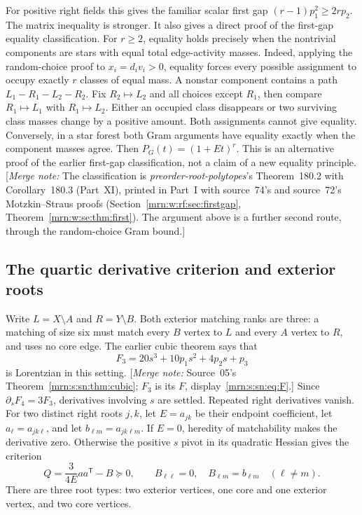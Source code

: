 \documentclass[11pt,a4paper]{article}
\theoremstyle{remark}\newtheorem{remark}[theorem]{Remark}
\newcommand{\PSD}{\succeq}                 %
\newcommand{\mnote}[1]{[\textit{Merge note:} #1]}
\newcommand{\prp}{\emph{preorder-root-polytopes}}
\begin{document}
For positive right fields this gives the familiar scalar first gap
$(r-1)p_1^2\ge2rp_2$. The matrix inequality is stronger.
It also gives a direct proof of the first-gap equality classification.
For $r\ge2$, equality holds precisely when the nontrivial components are
stars with equal total edge-activity masses.
Indeed, applying the random-choice proof to $x_i=d_i v_i>0$, equality
forces every possible assignment to occupy exactly $r$ classes of equal
mass. A nonstar component contains a path
$L_1-R_1-L_2-R_2$. Fix $R_2\mapsto L_2$ and all choices except $R_1$,
then compare $R_1\mapsto L_1$ with $R_1\mapsto L_2$.
Either an occupied class disappears or two surviving class masses change
by a positive amount. Both assignments cannot give equality.
Conversely, in a star forest both Gram arguments have equality exactly
when the component masses agree. Then $P_G(t)=(1+Et)^r$.
This is an alternative proof of the earlier first-gap classification,
not a claim of a new equality principle.
\mnote{The classification is \prp's Theorem~180.2 with Corollary~180.3
(Part~XI), printed in Part~I with source~74's and source~72's
Motzkin--Straus proofs (Section~\ref{mrn:w:rf:sec:firstgap},
Theorem~\ref{mrn:w:se:thm:first}). The argument above is a further second
route, through the random-choice Gram bound.}

\subsection{The quartic derivative criterion and exterior roots}
Write $L=X\setminus A$ and $R=Y\setminus B$. Both exterior matching ranks
are three: a matching of size six must match every $B$ vertex to $L$ and
every $A$ vertex to $R$, and uses no core edge.
The earlier cubic theorem \cite{b:m05} says that
\[
 F_3=20s^3+10p_1s^2+4p_2s+p_3
\]
is Lorentzian in this setting. \mnote{Source~05's
Theorem~\ref{mrn:s:sn:thm:cubic}; $F_3$ is its $F$,
display~\eqref{mrn:s:sn:eq:F}.} Since $\partial_sF_4=3F_3$, derivatives
involving $s$ are settled. Repeated right derivatives vanish. For two
distinct right roots $j,k$, let $E=a_{jk}$ be their endpoint coefficient,
let $a_\ell=a_{jk\ell}$, and let $b_{\ell m}=a_{jk\ell m}$.
If $E=0$, heredity of matchability makes the derivative zero. Otherwise
the positive $s$ pivot in its quadratic Hessian gives the criterion
\begin{equation}\label{mrn:t:tn:eq:paircriterion}
 Q=\frac{3}{4E}aa^{\mathsf T}-B\PSD0,\qquad
 B_{\ell\ell}=0,\quad B_{\ell m}=b_{\ell m}\quad(\ell\ne m).
\end{equation}
There are three root types: two exterior vertices, one core and one
exterior vertex, and two core vertices.
\end{document}
